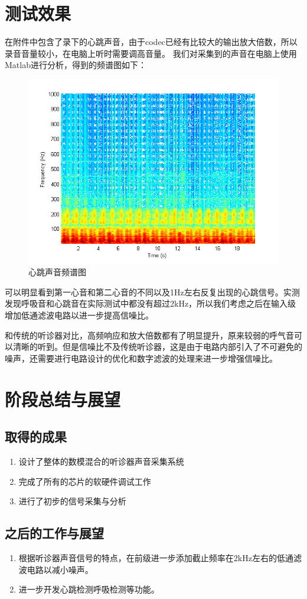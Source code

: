 \documentclass[16pt,a4paper]{article}
\begin{document}
\section{测试效果}
在附件中包含了录下的心跳声音，由于codec已经有比较大的输出放大倍数，所以录音音量较小，在电脑上听时需要调高音量。
我们对采集到的声音在电脑上使用Matlab进行分析，得到的频谱图如下：
\begin{figure}[H]
\centering
\includegraphics[scale = 1]{spectrogram.png}
\caption{心跳声音频谱图} 
\end{figure}
可以明显看到第一心音和第二心音的不同以及1Hz左右反复出现的心跳信号。实测发现呼吸音和心跳音在实际测试中都没有超过2kHz，所以我们考虑之后在输入级增加低通滤波电路以进一步提高信噪比。



和传统的听诊器对比，高频响应和放大倍数都有了明显提升，原来较弱的呼气音可以清晰的听到。但是信噪比不及传统听诊器，这是由于电路内部引入了不可避免的噪声，还需要进行电路设计的优化和数字滤波的处理来进一步增强信噪比。

\section{阶段总结与展望}
\subsection{取得的成果}
\begin{enumerate}
\item 设计了整体的数模混合的听诊器声音采集系统
\item 完成了所有的芯片的软硬件调试工作
\item 进行了初步的信号采集与分析
\end{enumerate}
\subsection{之后的工作与展望}
\begin{enumerate}
\item 根据听诊器声音信号的特点，在前级进一步添加截止频率在2kHz左右的低通滤波电路以减小噪声。
\item 进一步开发心跳检测呼吸检测等功能。
\end{enumerate}
\end{document}
